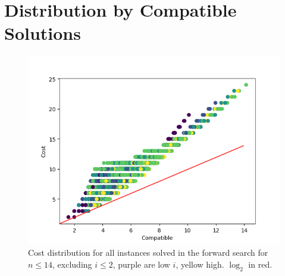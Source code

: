 \documentclass[twoside,leqno,twocolumn]{article}
\begin{document}
\section{Distribution by Compatible Solutions}

\begin{figure}[h]
  \includegraphics*[scale=.5]{figures/compatible_cost_relation.png}
  \caption*{Cost distribution for all instances solved in the forward search for $n\leq 14$, excluding $i\leq 2$, purple are low $i$, yellow high. $\log_2$ in red.} %
\end{figure}
\end{document}
